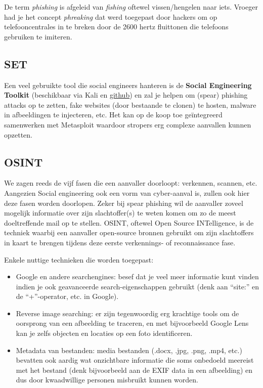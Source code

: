 \documentclass[
  10pt,
  dutch,
  paper=a4,
  ,captions=tableheading
]{scrbook}
\providecommand{\tightlist}{%
  \setlength{\itemsep}{0pt}\setlength{\parskip}{0pt}}
\begin{document}
\begin{tipblock}
De term \emph{phishing} is afgeleid van \emph{fishing} oftewel
vissen/hengelen naar iets. Vroeger had je het concept \emph{phreaking}
dat werd toegepast door hackers om op telefooncentrales in te breken
door de 2600 hertz fluittonen die telefoons gebruiken te imiteren.
\end{tipblock}

\subsection{SET}\label{set}

Een veel gebruikte tool die social engineers hanteren is de
\textbf{Social Engineering Toolkit} (beschikbaar via Kali en
\href{https://github.com/trustedsec/social-engineer-toolkit}{github}) en
zal je helpen om (spear) phishing attacks op te zetten, fake websites
(door bestaande te clonen) te hosten, malware in afbeeldingen te
injecteren, etc. Het kan op de koop toe geïntegreerd samenwerken met
Metasploit waardoor stropers erg complexe aanvallen kunnen opzetten.

\subsection{OSINT}\label{osint}

We zagen reeds de vijf fasen die een aanvaller doorloopt: verkennen,
scannen, etc. Aangezien Social engineering ook een vorm van cyber-aanval
is, zullen ook hier deze fasen worden doorlopen. Zeker bij spear
phishing wil de aanvaller zoveel mogelijk informatie over zijn
slachtoffer(s) te weten komen om zo de meest doeltreffende mail op te
stellen. OSINT, oftewel Open Source INTelligence, is de techniek waarbij
een aanvaller open-source bronnen gebruikt om zijn slachtoffers in kaart
te brengen tijdens deze eerste verkennings- of reconnaissance fase.

Enkele nuttige technieken die worden toegepast:

\begin{itemize}
\tightlist
\item
  Google en andere searchengines: besef dat je veel meer informatie kunt
  vinden indien je ook geavanceerde search-eigenschappen gebruikt (denk
  aan ``site:'' en de ``+''-operator, etc. in Google).
\item
  Reverse image searching: er zijn tegenwoordig erg krachtige tools om
  de oorsprong van een afbeelding te traceren, en met bijvoorbeeld
  Google Lens kan je zelfs objecten en locaties op een foto
  identificeren.
\item
  Metadata van bestanden: media bestanden (.docx, .jpg, .png, .mp4,
  etc.) bevatten ook aardig wat onzichtbare informatie die soms
  onbedoeld meereist met het bestand (denk bijvoorbeeld aan de EXIF data
  in een afbeelding) en dus door kwaadwillige personen misbruikt kunnen
  worden.
\end{itemize}
\end{document}
